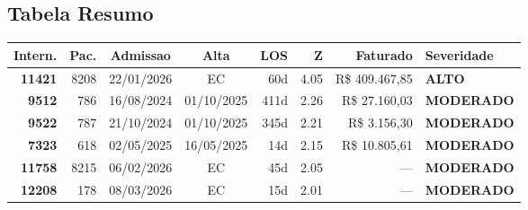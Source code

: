 \documentclass[a4paper,10pt]{article}
\begin{document}
\subsection{Tabela Resumo}
\begin{center}
\begin{longtable}{>{\scriptsize}r>{\scriptsize}r>{\scriptsize}c>{\scriptsize}c>{\scriptsize}r>{\scriptsize}r>{\scriptsize}r>{\scriptsize}l}
\toprule
\textbf{Intern.} & \textbf{Pac.} & \textbf{Admissao} & \textbf{Alta} & \textbf{LOS} & \textbf{Z} & \textbf{Faturado} & \textbf{Severidade} \\
\midrule
\endhead
\bottomrule
\endfoot

\textcolor{anomorange}{\textbf{11421}} & 8208 & 22/01/2026 & \textcolor{anomorange}{EC} & 60d & \textcolor{anomorange}{4.05} & R\$ 409.467,85 & \textcolor{anomorange}{\textbf{ALTO}} \\

\textcolor{anomyellow}{\textbf{9512}} & 786 & 16/08/2024 & 01/10/2025 & 411d & \textcolor{anomyellow}{2.26} & R\$ 27.160,03 & \textcolor{anomyellow}{\textbf{MODERADO}} \\

\textcolor{anomyellow}{\textbf{9522}} & 787 & 21/10/2024 & 01/10/2025 & 345d & \textcolor{anomyellow}{2.21} & R\$ 3.156,30 & \textcolor{anomyellow}{\textbf{MODERADO}} \\

\textcolor{anomyellow}{\textbf{7323}} & 618 & 02/05/2025 & 16/05/2025 & 14d & \textcolor{anomyellow}{2.15} & R\$ 10.805,61 & \textcolor{anomyellow}{\textbf{MODERADO}} \\

\textcolor{anomyellow}{\textbf{11758}} & 8215 & 06/02/2026 & \textcolor{anomorange}{EC} & 45d & \textcolor{anomyellow}{2.05} & --- & \textcolor{anomyellow}{\textbf{MODERADO}} \\

\textcolor{anomyellow}{\textbf{12208}} & 178 & 08/03/2026 & \textcolor{anomorange}{EC} & 15d & \textcolor{anomyellow}{2.01} & --- & \textcolor{anomyellow}{\textbf{MODERADO}} \\

\end{longtable}\end{center}
\end{document}
